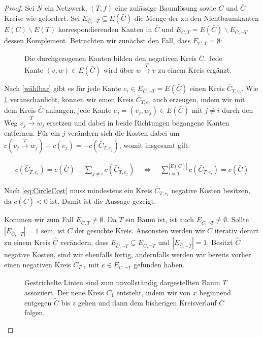 \begin{proof}Sei $N$ ein Netzwerk, $(T,f)$ eine zulässige Baumlösung sowie $C$ und $\bar{C}$ Kreise wie gefordert. Sei $E_{\bar{C},\neg T}\subseteq E(\bar{C})$ die Menge der zu den Nichtbaumkanten $E(C)\backslash E(T)$ korrespondierenden Kanten in $\bar{C}$ und $E_{\bar{C},T}=E(\bar{C})\backslash E_{\bar{C},\neg T}$ dessen Komplement. Betrachten wir zunächst den Fall, dass $E_{\bar{C},T}=\emptyset$:

\begin{figure}[!ht]\centering
	
	\caption{Die durchgezogenen Kanten bilden den negativen Kreis $\bar{C}$. Jede Kante $(v,w)\in E(\bar{C})$ wird über $w\xrightarrow{T}v$ zu einem Kreis ergänzt.}
	\label{fig:NTC}
\end{figure}

Nach \cref{wählbar} gibt es für jede Kante $e_i\in E_{\bar{C},\neg T}=E(\bar{C})$ einen Kreis $\bar{C}_{T,e_i}$. Wie \cref{fig:NTC} veranschaulicht, können wir einen Kreis $\bar{C}_{T,e_i}$ auch erzeugen, indem wir mit dem Kreis $\bar{C}$ anfangen, jede Kante $e_j=(v_j,w_j)\in E(\bar{C})$ mit $j\neq i$ durch den Weg $v_j\xrightarrow{T}w_j$ ersetzen und dabei in beide Richtungen begangene Kanten entfernen. Für ein $j$ verändern sich die Kosten dabei um $c(v_j\xrightarrow{T}w_j)-c(e_j)=-c(\bar{C}_{T,e_j})$, womit insgesamt gilt:

\begin{align}
c(\bar{C}_{T,e_i})=c(\bar{C})-\sum_{j\neq i} c(\bar{C}_{T,e_j})
\quad\Leftrightarrow\quad\sum_{i=1}^{|E(\bar{C})|} c(\bar{C}_{T,e_i})=c(\bar{C})\label{eq:CircleCost}
\end{align}

Nach \cref{eq:CircleCost} muss mindestens ein Kreis $\bar{C}_{T,e_i}$ negative Kosten besitzen, da $c(\bar{C})<0$ ist. Damit ist die Aussage gezeigt.

Kommen wir zum Fall $E_{\bar{C},T}\neq\emptyset$. Da $T$ ein Baum ist, ist auch $E_{\bar{C},\neg T}\neq\emptyset$. Sollte $|E_{\bar{C},\neg T}|=1$ sein, ist $\bar{C}$ der gesuchte Kreis. Ansonsten werden wir $\bar{C}$ iterativ derart zu einem Kreis $\hat{C}$ verändern, dass $E_{\hat{C},\neg T}\subsetneq E_{\bar{C},\neg T}$ und $|E_{\hat{C},\neg T}|=1$. Besitzt $\hat{C}$ negative Kosten, sind wir ebenfalls fertig, andernfalls werden wir bereits vorher einen negativen Kreis $\bar{C}_{T,e}$ mit $e\in E_{\bar{C},\neg T}$ gefunden haben.

\begin{figure}[!ht]\centering
	
	\caption{Gestrichelte Linien sind zum unvollständig dargestellten Baum $T$ assoziiert. Der neue Kreis $C_1$ entsteht, indem wir von $x$ beginnend entgegen $\tilde{C}$ bis $z$ gehen und dann dem bisherigen Kreisverlauf $\bar{C}$ folgen.}
	\label{fig:TC}
\end{figure}


\end{proof}
